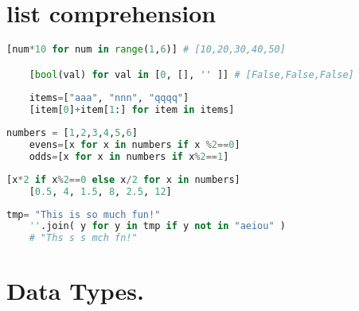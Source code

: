 \documentclass[10pt]{article}
\begin{document}
\section{list comprehension}
\begin{lstlisting}[language=Python]
	[num*10 for num in range(1,6)] # [10,20,30,40,50]

	[bool(val) for val in [0, [], '' ]] # [False,False,False]
	
	items=["aaa", "nnn", "qqqq"]
	[item[0]+item[1:] for item in items]
\end{lstlisting}
\begin{lstlisting}[language=Python]
	numbers = [1,2,3,4,5,6]
	evens=[x for x in numbers if x %2==0]
	odds=[x for x in numbers if x%2==1]
\end{lstlisting}
\begin{lstlisting}[language=Python]
	[x*2 if x%2==0 else x/2 for x in numbers]
	[0.5, 4, 1.5, 8, 2.5, 12]
\end{lstlisting}
\begin{lstlisting}[language=Python]
	tmp= "This is so much fun!"
	''.join( y for y in tmp if y not in "aeiou" )
	# "Ths s s mch fn!"
\end{lstlisting}
\section{Data Types.}
\end{document}
